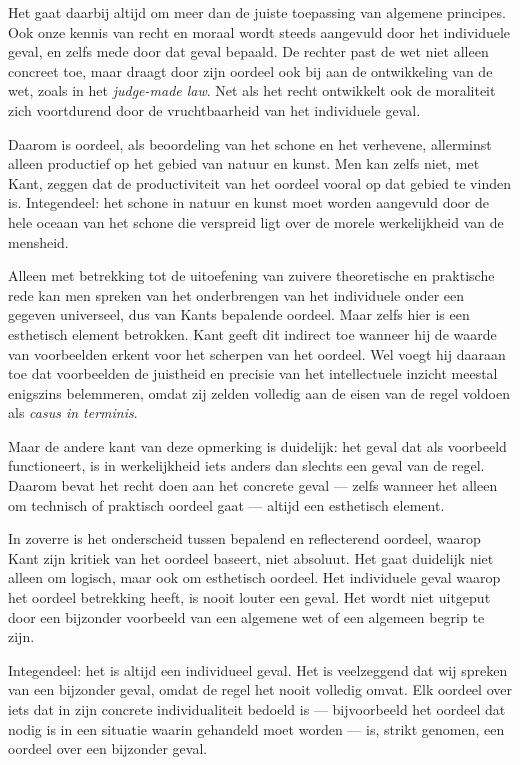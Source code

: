 Het gaat daarbij altijd om meer dan de juiste toepassing van algemene principes. Ook onze kennis van recht en moraal wordt steeds aangevuld door het individuele geval, en zelfs mede door dat geval bepaald. De rechter past de wet niet alleen concreet toe, maar draagt door zijn oordeel ook bij aan de ontwikkeling van de wet, zoals in het \textit{judge-made law}. Net als het recht ontwikkelt ook de moraliteit zich voortdurend door de vruchtbaarheid van het individuele geval.

Daarom is oordeel, als beoordeling van het schone en het verhevene, allerminst alleen productief op het gebied van natuur en kunst. Men kan zelfs niet, met Kant, zeggen dat de productiviteit van het oordeel vooral op dat gebied te vinden is. Integendeel: het schone in natuur en kunst moet worden aangevuld door de hele oceaan van het schone die verspreid ligt over de morele werkelijkheid van de mensheid.

Alleen met betrekking tot de uitoefening van zuivere theoretische en praktische rede kan men spreken van het onderbrengen van het individuele onder een gegeven universeel, dus van Kants bepalende oordeel. Maar zelfs hier is een esthetisch element betrokken. Kant geeft dit indirect toe wanneer hij de waarde van voorbeelden erkent voor het scherpen van het oordeel. Wel voegt hij daaraan toe dat voorbeelden de juistheid en precisie van het intellectuele inzicht meestal enigszins belemmeren, omdat zij zelden volledig aan de eisen van de regel voldoen als \textit{casus in terminis}.

Maar de andere kant van deze opmerking is duidelijk: het geval dat als voorbeeld functioneert, is in werkelijkheid iets anders dan slechts een geval van de regel. Daarom bevat het recht doen aan het concrete geval — zelfs wanneer het alleen om technisch of praktisch oordeel gaat — altijd een esthetisch element.

In zoverre is het onderscheid tussen bepalend en reflecterend oordeel, waarop Kant zijn kritiek van het oordeel baseert, niet absoluut. Het gaat duidelijk niet alleen om logisch, maar ook om esthetisch oordeel. Het individuele geval waarop het oordeel betrekking heeft, is nooit louter een geval. Het wordt niet uitgeput door een bijzonder voorbeeld van een algemene wet of een algemeen begrip te zijn.

Integendeel: het is altijd een individueel geval. Het is veelzeggend dat wij spreken van een bijzonder geval, omdat de regel het nooit volledig omvat. Elk oordeel over iets dat in zijn concrete individualiteit bedoeld is — bijvoorbeeld het oordeel dat nodig is in een situatie waarin gehandeld moet worden — is, strikt genomen, een oordeel over een bijzonder geval.

